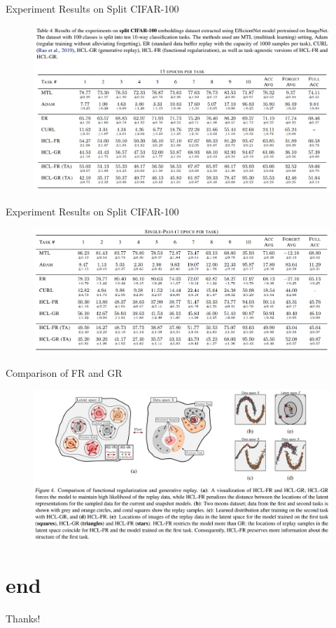 \documentclass{beamer}
\begin{document}
\begin{frame}{Experiment Results on Split CIFAR-100}
  \begin{figure}
    \includegraphics[width=1\textwidth]{./figures/Split_CIFAR100_Results}
  \end{figure}
\end{frame}

\begin{frame}{Experiment Results on Split CIFAR-100}
  \begin{figure}
    \includegraphics[width=1\textwidth]{./figures/Split_CIFAR100_Results_}
  \end{figure}
\end{frame}

\begin{frame}{Comparison of FR and GR}
  \begin{figure}
    \includegraphics[width=1\textwidth]{./figures/Comparison_FR_GR}
  \end{figure}
\end{frame}

\section{end}
\begin{frame}
  \centering \large Thanks!
\end{frame}

\end{document}
